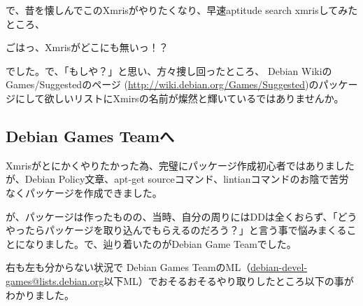 \documentclass[mingoth,a4paper]{jsarticle}
\begin{document}
 で、昔を懐しんでこのXmrisがやりたくなり、早速aptitude search xmrisしてみたところ、

 \begin{center}
  \Large{ごはっ、Xmrisがどこにも無いっ！？}
 \end{center}

 でした。で、「もしや？」と思い、方々捜し回ったところ、
Debian WikiのGames/Suggestedのページ
(\url{http://wiki.debian.org/Games/Suggested})のパッケージにして欲しいリストにXmirsの名前が燦然と輝いているではありませんか。


\subsection{Debian Games Teamへ}

 Xmrisがとにかくやりたかった為、完璧にパッケージ作成初心者ではありましたが、Debian Policy文章、apt-get sourceコマンド、lintianコマンドのお陰で苦労なくパッケージを作成できました。

 が、パッケージは作ったものの、当時、自分の周りにはDDは全くおらず、「どうやったらパッケージを取り込んでもらえるのだろう？」と言う事で悩みまくることになりました。で、辿り着いたのがDebian Game Teamでした。

 右も左も分からない状況で Debian Games TeamのML（\url{debian-devel-games@lists.debian.org}以下ML）でおそるおそるやり取りしたところ以下の事がわかりました。
\end{document}
